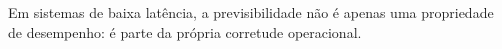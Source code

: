
\begin{epigrafe}%
Em sistemas de baixa latência, a previsibilidade não é apenas uma propriedade de desempenho: é parte da própria corretude operacional.
\end{epigrafe}
